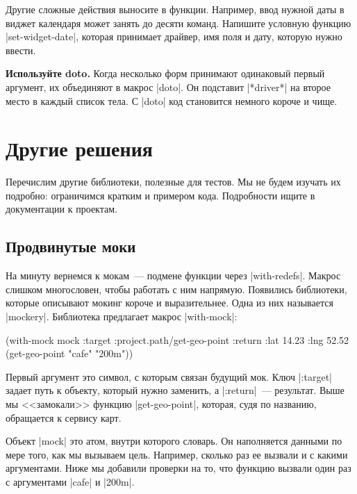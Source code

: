 Другие сложные действия выносите в функции. Например, ввод нужной даты в виджет
календаря может занять до десяти команд. Напишите условную функцию
\spverb|set-widget-date|, которая принимает драйвер, имя поля и дату, которую
нужно ввести.

\textbf{Используйте doto.} Когда несколько форм принимают одинаковый первый
аргумент, их объединяют в макрос \spverb|doto|. Он подставит \spverb|*driver*|
на второе место в каждый список тела. С \spverb|doto| код становится немного
короче и чище.

\section{Другие решения}

Перечислим другие библиотеки, полезные для тестов. Мы не будем изучать их
подробно: ограничимся кратким и примером кода. Подробности ищите в документации
к проектам.

\subsection{Продвинутые моки}

На минуту вернемся к мокам~--- подмене функции через
\spverb|with-redefs|. Макрос слишком многословен, чтобы работать с ним
напрямую. Появились библиотеки, которые описывают мокинг короче и
выразительнее. Одна из них называется
\spverb|mockery|. Библиотека
предлагает макрос \spverb|with-mock|:

\begin{english}
  \begin{clojure}
(with-mock mock
  {:target :project.path/get-geo-point
   :return {:lat 14.23 :lng 52.52}}
  (get-geo-point "cafe" "200m"))
  \end{clojure}
\end{english}

Первый аргумент это символ, с которым связан будущий мок. Ключ \spverb|:target|
задает путь к объекту, который нужно заменить, а \spverb|:return|~---
результат. Выше мы <<замокали>> функцию \spverb|get-geo-point|, которая, судя по
названию, обращается к сервису карт.

Объект \spverb|mock| это атом, внутри которого словарь. Он наполняется данными
по мере того, как мы вызываем цель. Например, сколько раз ее вызвали и с какими
аргументами. Ниже мы добавили проверки на то, что функцию вызвали один раз с
аргументами \spverb|cafe| и \spverb|200m|.

